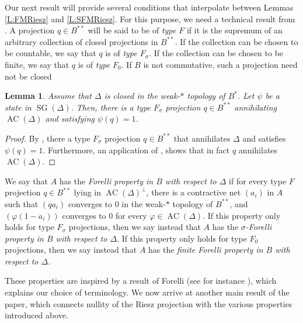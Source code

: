 \documentclass[10pt]{amsart}
\renewcommand{\phi}{\varphi}
\newcommand{\AC}{\operatorname{AC}}
\newcommand{\SG}{\operatorname{SG}}
\newtheorem{lemma}{Lemma}[section]
\theoremstyle{definition}
\begin{document}
Our next result will provide several conditions that interpolate between Lemmas \ref{L:FMRiesz} and \ref{L:SFMRiesz}. For this purpose, we need a technical result from \cite{CT2023Henkin}. A projection $q\in B^{**}$ will be said to be of \emph{type $F$} if it is the supremum of an arbitrary collection of closed projections in $B^{**}$. If the collection can be chosen to be countable, we say that $q$ is of \emph{type $F_\sigma$}. If the collection can be chosen to be finite, we say that $q$ is of \emph{type $F_0$}. If $B$ is not commutative, such a projection need not be closed \cite[Example II.6]{akemann1969}





\begin{lemma}\label{L:Rainwater}
Assume that $\Delta$ is closed in the weak-$*$ topology of $B^*$. Let $\psi$ be a state in $\SG(\Delta)$. Then, there is a type $F_\sigma$ projection $q\in B^{**}$ annihilating $\AC(\Delta)$ and satisfying $\psi(q)=1$.  
\end{lemma}
\begin{proof}
By \cite[Theorem 3.7]{CT2023Henkin}, there a type $F_\sigma$ projection $q\in B^{**}$ that  annihilates $\Delta$  and satisfies $\psi(q)=1$. Furthermore, an application of \cite[Lemma 2.4]{CT2023Henkin}, shows that in fact $q$ annihilates $\AC(\Delta)$. \end{proof}


We say that $A$ has the \emph{Forelli property in $B$ with respect to $\Delta$} if 
for every type $F$ projection $q\in B^{**}$ lying in $\AC(\Delta)^{\perp}$,  there is a contractive net $(a_i)$ in $A$ such that $(q a_i )$ converges to $0$ in the weak-$*$ topology of $B^{**}$, and $(\phi(1-a_i))$ converges to $0$ for every $\phi\in \AC(\Delta)$.  If this property only holds for type $F_\sigma$ projections, then we say instead that $A$ has the \emph{$\sigma$-Forelli property in $B$ with respect to $\Delta$}. If this property only holds for type $F_0$ projections, then we say instead that $A$ has the \emph{finite Forelli property in $B$ with respect to $\Delta$}. 

These properties are inspired by a result of Forelli (see for instance \cite[Lemma 9.5.5]{rudin2008}), which explains our choice of terminology. We now arrive at another main result of the paper, which connects nullity of the Riesz projection with the various properties introduced above.
\end{document}
